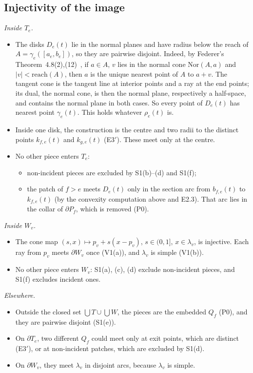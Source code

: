 \documentclass[preprint,12pt]{elsarticle}
\theoremstyle{definition}
\theoremstyle{remark}
\begin{document}
\subsection{Injectivity of the image}
\emph{Inside $T_e$.}
\begin{itemize}
\item The disks $D_e(t)$ lie in the normal planes and have radius below the reach of $A=\gamma_e([a_e,b_e])$, so they
are pairwise disjoint. Indeed, by Federer's Theorem~4.8(2),(12)~\cite[pp.~434--435]{Federer59}, if $a\in A$, $v$ lies
in the normal cone $\mathrm{Nor}(A,a)$ and $|v|<\mathrm{reach}(A)$, then $a$ is the unique nearest point of $A$ to $a+v$.
The tangent cone is the tangent line at interior points and a ray at the end points; its dual, the normal cone, is
then the normal plane, respectively a half-space, and contains the normal plane in both cases. So every point of $D_e(t)$ has nearest point $\gamma_e(t)$. This holds
whatever $\rho_e(t)$ is.
\item Inside one disk, the construction is the centre and two radii to the distinct points $k_{f,e}(t)$ and
$k_{g,e}(t)$ (E3$'$). These meet only at the centre.
\item No other piece enters $T_e$:
  \begin{itemize}
  \item non-incident pieces are excluded by S1(b)--(d) and S1(f);
  \item the patch of $f>e$ meets $D_e(t)$ only in the section arc from $b_{f,e}(t)$ to $k_{f,e}(t)$ (by the convexity
  computation above and E2.3). That arc lies in the collar of $\partial P_f$, which is removed (P0).
  \end{itemize}
\end{itemize}

\emph{Inside $W_v$.}
\begin{itemize}
\item The cone map $(s,x)\mapsto p_v+s(x-p_v)$, $s\in(0,1]$, $x\in\lambda_v$, is injective. Each ray from $p_v$ meets
$\partial W_v$ once (V1(a)), and $\lambda_v$ is simple (V1(b)).
\item No other piece enters $W_v$: S1(a), (c), (d) exclude non-incident pieces, and S1(f) excludes incident ones.
\end{itemize}

\emph{Elsewhere.}
\begin{itemize}
\item Outside the closed set $\bigcup T\cup\bigcup W$, the pieces are the embedded $Q_f$ (P0), and they are pairwise
disjoint (S1(e)).
\item On $\partial T_e$, two different $Q_f$ could meet only at exit points, which are distinct (E3$'$), or at
non-incident patches, which are excluded by S1(d).
\item On $\partial W_v$, they meet $\lambda_v$ in disjoint arcs, because $\lambda_v$ is simple.
\end{itemize}
\end{document}
